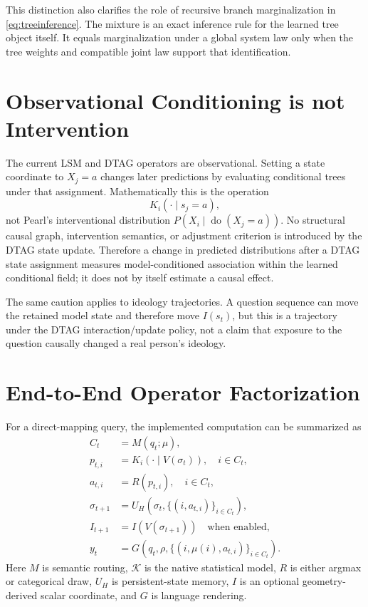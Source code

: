 \documentclass[journal]{IEEEtran}
\newcommand{\K}{\mathcal{K}}
\newcommand{\1}{\mathbf{1}}
\begin{document}
This distinction also clarifies the role of recursive branch marginalization in \eqref{eq:treeinference}. The mixture is an exact inference rule for the learned tree object itself. It equals marginalization under a global system law only when the tree weights and compatible joint law support that identification.

\section{Observational Conditioning is not Intervention}
\label{sec:causal}

The current LSM and DTAG operators are observational. Setting a state coordinate to $X_j=a$ changes later predictions by evaluating conditional trees under that assignment. Mathematically this is the operation
\begin{equation}
  K_i(\cdot\mid s_j=a),
\end{equation}
not Pearl's interventional distribution $P(X_i\mid\operatorname{do}(X_j=a))$. No structural causal graph, intervention semantics, or adjustment criterion is introduced by the DTAG state update. Therefore a change in predicted distributions after a DTAG state assignment measures model-conditioned association within the learned conditional field; it does not by itself estimate a causal effect.

The same caution applies to ideology trajectories. A question sequence can move the retained model state and therefore move $I(s_t)$, but this is a trajectory under the DTAG interaction/update policy, not a claim that exposure to the question causally changed a real person's ideology.

\section{End-to-End Operator Factorization}
\label{sec:factorization}

For a direct-mapping query, the implemented computation can be summarized as
\begin{align}
  C_t &= M(q_t;\mu),\label{eq:fac1}\\
  p_{t,i} &= K_i(\cdot\mid V(\sigma_t)),\quad i\in C_t,\label{eq:fac2}\\
  a_{t,i} &= R(p_{t,i}),\quad i\in C_t,\label{eq:fac3}\\
  \sigma_{t+1} &= U_H\!\left(\sigma_t,\{(i,a_{t,i})\}_{i\in C_t}\right),\label{eq:fac4}\\
  I_{t+1} &= I(V(\sigma_{t+1}))\quad\text{when enabled},\label{eq:fac5}\\
  y_t &= G\!\left(q_t,\rho,\{(i,\mu(i),a_{t,i})\}_{i\in C_t}\right).
  \label{eq:fac6}
\end{align}
Here $M$ is semantic routing, $\K$ is the native statistical model, $R$ is either argmax or categorical draw, $U_H$ is persistent-state memory, $I$ is an optional geometry-derived scalar coordinate, and $G$ is language rendering.
\end{document}
